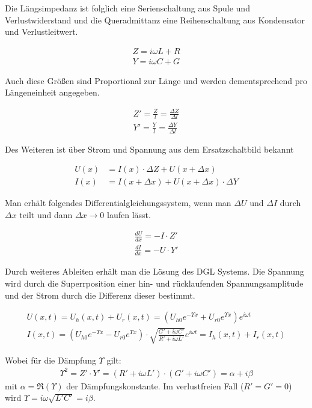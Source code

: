 
Die Längsimpedanz ist folglich eine Serienschaltung aus Spule und Verlustwiderstand und die Queradmittanz eine Reihenschaltung aus Kondensator und Verlustleitwert.

\begin{align}
    Z = i\omega L + R \\
    Y = i\omega C + G
\end{align}

Auch diese Größen sind Proportional zur Länge und werden dementsprechend pro Längeneinheit angegeben.

\begin{align}
    Z'= \frac{Z}{l} = \frac{\Delta Z}{\Delta l} \\
    Y'= \frac{Y}{l} = \frac{\Delta Y}{\Delta l}
\end{align}

Des Weiteren ist über Strom und Spannung aus dem Ersatzschaltbild bekannt

\begin{align}
    U(x) &= I(x) \cdot \Delta Z + U(x+\Delta x) \\
    I(x) &= I(x+\Delta x) + U(x + \Delta x) \cdot \Delta Y
\end{align}

Man erhält folgendes Differentialgleichungssystem, wenn man $\Delta U \text{ und } \Delta I$ durch $\Delta x$ teilt und dann $\Delta x \rightarrow 0$ laufen lässt.

\begin{align}
    \frac{dU}{dx} = -I \cdot Z' \\
    \frac{dI}{dx} = -U \cdot Y'
\end{align}

Durch weiteres Ableiten erhält man die Lösung des DGL Systems. Die Spannung wird durch die Superrposition einer hin- und rücklaufenden Spannungsamplitude und der Strom durch die Differenz dieser bestimmt.

\begin{align}
    U(x,t) = U_h(x,t) + U_r(x,t) = (U_{h0} e^{- \Upsilon x} + U_{r0} e^{\Upsilon x}) e^{i\omega t} \\
    I(x,t) = (U_{h0} e^{- \Upsilon x} - U_{r0} e^{\Upsilon x}) \cdot \sqrt{\frac{G'+i\omega C'}{R'+i\omega L'}} e^{i\omega t} = I_h(x,t) + I_r(x,t)
\end{align}

Wobei für die Dämpfung $\Upsilon $ gilt:
\begin{align}
    \Upsilon ^2 = Z' \cdot Y' = (R' + i\omega L') \cdot (G' + i\omega C') = \alpha + i\beta
\end{align}
mit $\alpha = \Re  (\Upsilon)$ der Dämpfungskonstante. Im verlustfreien Fall ($R'= G'=  0 $) wird $\Upsilon = i\omega \sqrt{L'C'} = i\beta$. \\

